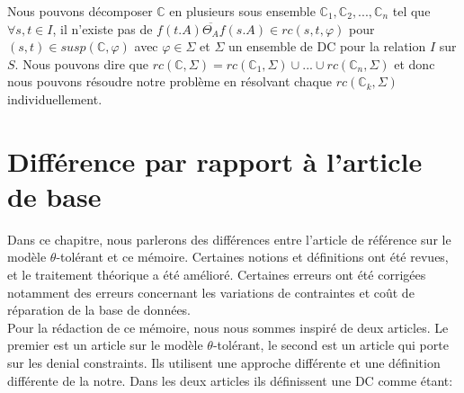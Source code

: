 \documentclass[letterpaper, 12pt]{report}
\theoremstyle{definition}
\newcommand{\C}{\mathbb{C}}
\begin{document}
Nous pouvons décomposer $\C$ en plusieurs sous ensemble $\C_1 , \C_2,...,\C_n$ tel que $\forall s,t \in I$, il n'existe pas de $f(t.A) \overline{\Theta_A} f(s.A) \in rc(s,t,\varphi)$ pour $(s,t) \in susp(\C,\varphi)$ avec $\varphi \in \Sigma$ et $\Sigma$ un ensemble de DC pour la relation $I$ sur $S$. Nous pouvons dire que $rc(\C,\Sigma) = rc(\C_1,\Sigma) \cup ... \cup rc(\C_n,\Sigma) $ et donc nous pouvons résoudre notre problème en résolvant chaque $rc(\C_k , \Sigma)$ individuellement.

%
%
%
%
%    
%     
%
%

\chapter{Différence par rapport à l'article de base}

Dans ce chapitre, nous parlerons des différences entre l'article de référence sur le modèle $\theta$-tolérant et ce mémoire. Certaines notions et définitions ont été revues, et le traitement théorique a été amélioré. Certaines erreurs ont été corrigées notamment des erreurs concernant les variations de contraintes et coût de réparation de la base de données.\\

Pour la rédaction de ce mémoire, nous nous sommes inspiré de deux articles. Le premier est un article sur le modèle $\theta$-tolérant, le second est un article qui porte sur les denial constraints. Ils utilisent une approche différente et une définition différente de la notre. Dans les deux articles \cite{main,DCs} ils définissent une DC comme étant:
\end{document}
